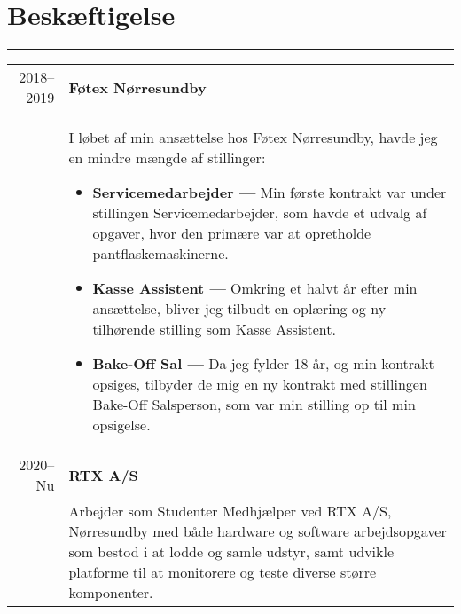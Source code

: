 \documentclass{article}
\begin{document}
\section*{Beskæftigelse}
\hrule width5cm
\begin{longtabu} to \textwidth {r|X}
2018--2019 & \textbf{Føtex Nørresundby}\\
&   I løbet af min ansættelse hos Føtex Nørresundby, havde jeg en mindre mængde af stillinger:
    \begin{itemize}\setlength\itemsep{0em}
        \item[] \textbf{Servicemedarbejder --- } Min første kontrakt var under stillingen 
            Servicemedarbejder, som havde et udvalg af opgaver, hvor den primære var at
            opretholde pantflaskemaskinerne.
        \item[] \textbf{Kasse Assistent --- } Omkring et halvt år efter min ansættelse, bliver
            jeg tilbudt en oplæring og ny tilhørende stilling som Kasse Assistent.
        \item[] \textbf{Bake-Off Sal --- } Da jeg fylder 18 år, og min kontrakt opsiges,
            tilbyder de mig en ny kontrakt med stillingen Bake-Off Salsperson, som var min stilling
            op til min opsigelse.
    \end{itemize} \\
2020--Nu & \textbf{RTX A/S}\\
&   Arbejder som Studenter Medhjælper ved RTX A/S, Nørresundby med både hardware og software
    arbejdsopgaver som bestod i at lodde og samle udstyr, samt udvikle platforme til at
    monitorere og teste diverse større komponenter. 
\end{longtabu}
\end{document}
